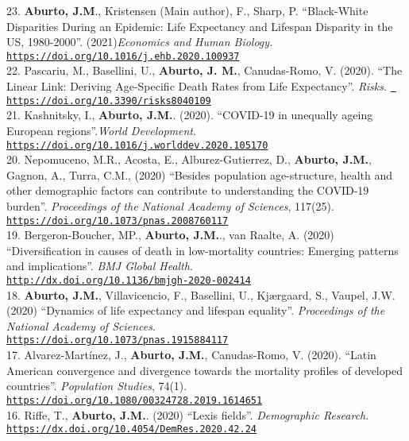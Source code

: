 \documentclass[12pt]{article}
\providecommand*\url[1]{\href{#1}{#1}}
\renewcommand*\url[1]{\href{#1}{\texttt{#1}}}
\begin{document}
23. \textbf{Aburto, J.M}., Kristensen (Main author), F., Sharp, P. ``Black-White Disparities During an Epidemic: Life Expectancy and Lifespan Disparity in the US, 1980-2000''. (2021)\textit{Economics and Human Biology.} \url{https://doi.org/10.1016/j.ehb.2020.100937}\\

22. Pascariu, M., Basellini, U., \textbf{Aburto, J. M.}, Canudas-Romo, V. (2020). ``The Linear Link: Deriving Age-Specific Death Rates from Life Expectancy''.  \textit{Risks}. \url{ https://doi.org/10.3390/risks8040109}\\

21. Kashnitsky, I., \textbf{Aburto, J.M.}. (2020). ``COVID-19 in unequally ageing European regions''.\textit{World Development}. \\
\url{https://doi.org/10.1016/j.worlddev.2020.105170} \\

20. Nepomuceno, M.R.,  Acosta, E., Alburez-Gutierrez, D., \textbf{Aburto, J.M.},  Gagnon, A.,  Turra, C.M., (2020) ``Besides population age-structure, health and other demographic factors can contribute to understanding the COVID-19 burden''.  \textit{Proceedings of the National Academy of Sciences}, 117(25). \url{https://doi.org/10.1073/pnas.2008760117} \\

19. Bergeron-Boucher, MP., \textbf{Aburto, J.M.}., van Raalte, A. (2020) ``Diversification in causes of death in low-mortality countries:  Emerging patterns and implications''. \textit{BMJ Global Health}.\\ \url{http://dx.doi.org/10.1136/bmjgh-2020-002414} \\

18. \textbf{Aburto, J.M.},  Villavicencio, F., Basellini, U., Kj{\ae}rgaard, S., Vaupel, J.W. (2020) ``Dynamics of life expectancy and lifespan equality''.  \textit{Proceedings of the National Academy of Sciences}.\\ \url{https://doi.org/10.1073/pnas.1915884117} \\

17. Alvarez-Mart\'inez, J., \textbf{Aburto, J.M.}, Canudas-Romo, V. (2020). ``Latin American convergence and divergence towards the mortality profiles of developed countries''. \textit{Population Studies}, 74(1).\\ \url{https://doi.org/10.1080/00324728.2019.1614651} \\

16. Riffe, T., \textbf{Aburto, J.M.}. (2020) ``Lexis fields''. \textit{Demographic Research}. \\ 
 \url{https://dx.doi.org/10.4054/DemRes.2020.42.24} \\
\end{document}

